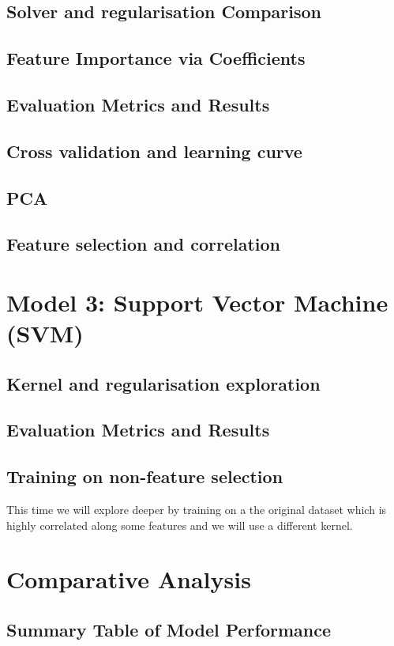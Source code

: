 \documentclass[10pt,twocolumn]{article}
\begin{document}
\subsection{Solver and regularisation Comparison}
\subsection{Feature Importance via Coefficients}

\subsection{Evaluation Metrics and Results}
\subsection{Cross validation and learning curve}
\subsection{PCA}
\subsection{Feature selection and correlation}

\section{Model 3: Support Vector Machine (SVM)}
\subsection{Kernel and regularisation exploration}
\subsection{Evaluation Metrics and Results}
\subsection{Training on non-feature selection}
This time we will explore deeper by training on a the original dataset which is highly correlated along some features and we will use a different kernel.

\section{Comparative Analysis}
\subsection{Summary Table of Model Performance}
\end{document}
